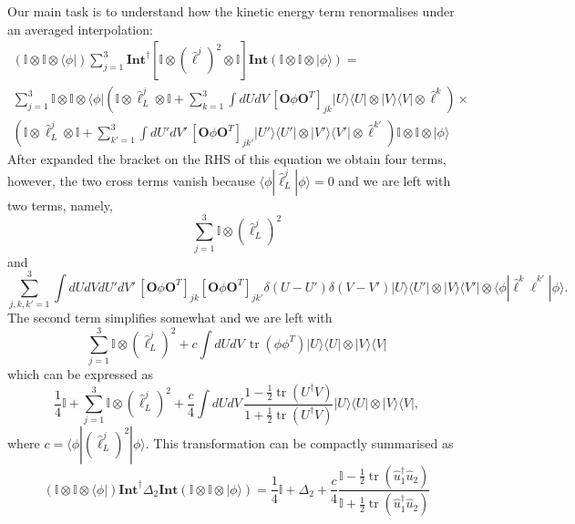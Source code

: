 \documentclass[12pt]{amsart}
\newcommand{\tr}{\operatorname{tr}}
\def\CAv{\mathbf{Int}}
\theoremstyle{definition}
\theoremstyle{remark}
\numberwithin{equation}{section}
\begin{document}
Our main task is to understand how the kinetic energy term renormalises under an averaged interpolation:
\begin{multline}
	\left(\mathbb{I}\otimes \mathbb{I} \otimes \langle \phi|\right) \sum_{j = 1}^{3}\CAv^\dag \left[\mathbb{I} \otimes\left(\widehat{\ell}^j\right)^2 \otimes  \mathbb{I} \right] \CAv \left(\mathbb{I}\otimes \mathbb{I} \otimes |\phi\rangle\right) = \\
	\sum_{j = 1}^{3}\mathbb{I}\otimes \mathbb{I} \otimes \langle \phi|\left(\mathbb{I}\otimes \widehat{\ell}_L^{j}\otimes \mathbb{I} + \sum_{k=1}^3 \int dUdV \, [\mathbf{O} \phi \mathbf{O}^T]_{jk} |U\rangle\langle U| \otimes  |V\rangle\langle V| \otimes  \widehat{\ell}^k\right)\times \\ \left(\mathbb{I}\otimes \widehat{\ell}_L^{j}\otimes \mathbb{I} + \sum_{k'=1}^3 \int dU'dV' \, [\mathbf{O} \phi \mathbf{O}^T]_{jk'} |U'\rangle\langle U'| \otimes  |V'\rangle\langle V'| \otimes  \widehat{\ell}^{k'}\right) \mathbb{I}\otimes \mathbb{I} \otimes |\phi\rangle
\end{multline}
After expanded the bracket on the RHS of this equation we obtain four terms, however, the two cross terms vanish because $\langle \phi|\widehat{\ell}^j_L|\phi\rangle = 0$ and we are left with two terms, namely,
\begin{equation}
	\sum_{j = 1}^{3}\mathbb{I}\otimes (\widehat{\ell}_L^{j})^2
\end{equation}
and
\begin{equation}
 \sum_{j,k,k'=1}^3 \int dUdVdU'dV' \, [\mathbf{O} \phi \mathbf{O}^T]_{jk}[\mathbf{O} \phi \mathbf{O}^T]_{jk'}\delta(U-U')\delta(V-V') |U\rangle\langle U'| \otimes  |V\rangle\langle V'| \otimes  \langle \phi|\widehat{\ell}^k\widehat{\ell}^{k'}|\phi\rangle.
\end{equation}
The second term simplifies somewhat and we are left with
\begin{equation}
	\sum_{j = 1}^{3}\mathbb{I}\otimes (\widehat{\ell}_L^{j})^2+ c \int dUdV\, \tr(\phi\phi^T ) |U\rangle\langle U| \otimes  |V\rangle\langle V|
\end{equation}
which can be expressed as 
\begin{equation}
	\frac14\mathbb{I} + \sum_{j = 1}^{3}\mathbb{I}\otimes (\widehat{\ell}_L^{j})^2 +\frac{c}{4} \int dUdV\, \frac{1-\frac12\tr(U^\dag V)}{1+\frac12\tr(U^\dag V)}
 |U\rangle\langle U| \otimes  |V\rangle\langle V|,
\end{equation}
where $c = \langle \phi|(\widehat{\ell}_L^{j})^2|\phi\rangle$.
This transformation can be compactly summarised as
\begin{equation}
	\left(\mathbb{I}\otimes \mathbb{I} \otimes \langle \phi|\right)\CAv^\dag  \Delta_2 \CAv \left(\mathbb{I}\otimes \mathbb{I} \otimes |\phi\rangle\right) = \frac14\mathbb{I} + \Delta_2 +\frac{c}{4}\frac{\mathbb{I}-\frac12\tr(\widehat{u}_1^\dag \widehat{u}_2)}{\mathbb{I}+\frac12\tr(\widehat{u}_1^\dag \widehat{u}_2)}
\end{equation}
\end{document}
